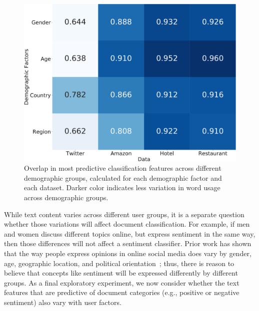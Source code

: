 \begin{figure}[t]
\centering
\includegraphics[scale=0.25]{./images/chapter4/overlap.pdf}
\caption{Overlap in most predictive classification features across different demographic groups, calculated for each demographic factor and each dataset. Darker color indicates less variation in word usage across demographic groups.
}
\label{chap4:fig:overlap}
\end{figure}

While text content varies across different user groups,
it is a separate question whether those variations will affect document classification.
For example, if men and women discuss different topics online,
but express sentiment in the same way,
then those differences will not affect a sentiment classifier.
Prior work has shown that the way 
people express opinions in online social media 
does vary by gender, age, geographic location, and political orientation~\cite{hinds2018demographic};
thus, there is reason to believe that concepts like sentiment will be expressed differently by different groups.
As a final exploratory experiment,
we now consider whether the text features that are predictive of
document categories (e.g., positive or negative sentiment)
also vary with user factors.




